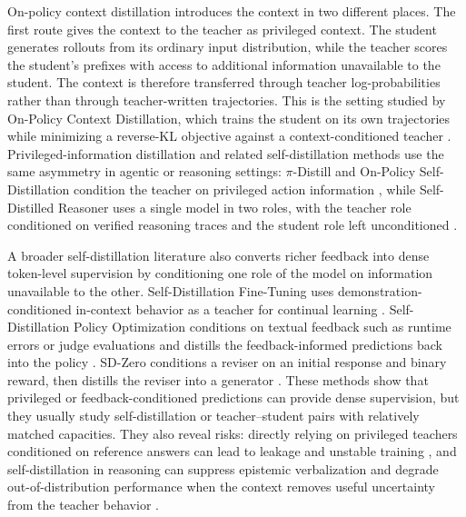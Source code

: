 On-policy context distillation introduces the context in two different places. The first route gives the context to the teacher as privileged context. The student generates rollouts from its ordinary input distribution, while the teacher scores the student's prefixes with access to additional information unavailable to the student. The context is therefore transferred through teacher log-probabilities rather than through teacher-written trajectories. This is the setting studied by On-Policy Context Distillation, which trains the student on its own trajectories while minimizing a reverse-KL objective against a context-conditioned teacher \cite{yeOnPolicyContextDistillation2026}. Privileged-information distillation and related self-distillation methods use the same asymmetry in agentic or reasoning settings: $\pi$-Distill and On-Policy Self-Distillation condition the teacher on privileged action information \cite{penalozaPrivilegedInformationDistillation2026}, while Self-Distilled Reasoner uses a single model in two roles, with the teacher role conditioned on verified reasoning traces and the student role left unconditioned \cite{zhaoSelfDistilledReasonerOnPolicy2026}.

A broader self-distillation literature also converts richer feedback into dense token-level supervision by conditioning one role of the model on information unavailable to the other. Self-Distillation Fine-Tuning uses demonstration-conditioned in-context behavior as a teacher for continual learning \cite{shenfeldSelfDistillationEnablesContinual2026}. Self-Distillation Policy Optimization conditions on textual feedback such as runtime errors or judge evaluations and distills the feedback-informed predictions back into the policy \cite{hubotterReinforcementLearningSelfDistillation2026}. SD-Zero conditions a reviser on an initial response and binary reward, then distills the reviser into a generator \cite{heSelfDistillationZeroSelfRevision2026}. These methods show that privileged or feedback-conditioned predictions can provide dense supervision, but they usually study self-distillation or teacher--student pairs with relatively matched capacities. They also reveal risks: directly relying on privileged teachers conditioned on reference answers can lead to leakage and unstable training \cite{yangSelfDistilledRLVR2026,yangSelfDistilledRLVR2026a}, and self-distillation in reasoning can suppress epistemic verbalization and degrade out-of-distribution performance when the context removes useful uncertainty from the teacher behavior \cite{kimWhyDoesSelfDistillation2026}.

